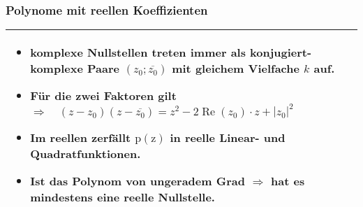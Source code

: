 		\subsubsection{Polynome mit reellen Koeffizienten}
			\begin{tabular}{|m{13cm}|}
				\hline
				\begin{itemize}
					\item komplexe Nullstellen treten immer als konjugiert-komplexe Paare $(z_0; \overline{z_0})$ mit gleichem Vielfache $k$ auf.
					\item Für die zwei Faktoren gilt $\Rightarrow \quad\left(z-z_{0}\right)(z-\overline{z_{0}})=z^{2}-2 \operatorname{Re}\left(z_{0}\right) \cdot z+\left|z_{0}\right|^{2}$
					\item Im reellen zerfällt $\operatorname{p(z)}$ in \textbf{reelle Linear- und Quadratfunktionen}.
					\item Ist das Polynom von \textbf{ungeradem Grad} $\Rightarrow$ hat es \textbf{mindestens eine reelle Nullstelle}.
				\end{itemize}\\[1pt]
				\hline
			\end{tabular}
	
